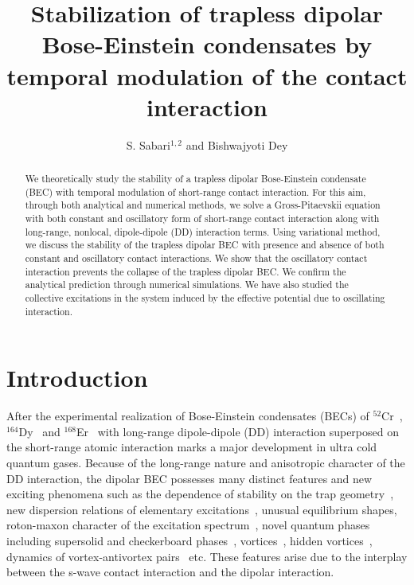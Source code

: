 \documentclass[amsmath,amssymb,article,twocolumn,superscriptaddress,showpacs,10pt]{revtex4-1}
\begin{document}
\title[Stabilization of trapless dipolar BEC]{Stabilization of trapless dipolar Bose-Einstein condensates by temporal modulation of the contact interaction}
\author{S. Sabari$^{1,2}$ and Bishwajyoti Dey}

\begin{abstract}
We theoretically study the stability of a trapless dipolar Bose-Einstein condensate (BEC) with temporal modulation of short-range contact interaction. For this aim, through both analytical and numerical methods, we solve a Gross-Pitaevskii equation with both constant and oscillatory form of short-range contact interaction along with long-range, nonlocal, dipole-dipole (DD) interaction terms. Using variational method, we discuss the stability of the trapless dipolar BEC with presence and absence of both constant and oscillatory contact interactions. We show that the oscillatory contact interaction prevents the collapse of the trapless dipolar BEC. We confirm the analytical prediction through numerical simulations. We have also studied the collective excitations in the system induced by the effective potential due to oscillating interaction. 
\end{abstract}
\maketitle

\section{Introduction}


After the experimental realization of Bose-Einstein condensates (BECs) of $^{52}$Cr~\cite{Koch:2008,Lahaye:2009}, $^{164}$Dy~\cite{Lu:2011,Youn:2010} and $^{168}$Er~\cite{Aikawa:2012} with long-range dipole-dipole (DD) interaction superposed on the short-range atomic interaction marks a major development in ultra cold quantum gases. Because of the long-range nature and  anisotropic character of the DD interaction, the dipolar BEC possesses many distinct features and new exciting phenomena such as the dependence of stability on the trap geometry~\cite{Koch:2008,Lahaye:2009}, new dispersion relations of elementary excitations~\cite{Wilson:2010,Ticknor:2011,Santos:2003}, unusual equilibrium shapes, roton-maxon character of the excitation spectrum~\cite{Santos:2003,Santos:2000,Goral:2002,Yi:2003,Ronen:2007,Boudjemaa:2013}, novel quantum phases including supersolid and checkerboard phases~\cite{Baranov:2008,Tieleman:2011,Zhou:2010}, vortices~\cite{vor1,vor2}, hidden vortices~\cite{Sabari2017}, dynamics of vortex-antivortex pairs~\cite{Sabari2018}  etc. These features arise due to the interplay between the s-wave contact interaction and the dipolar interaction. 
\end{document}
